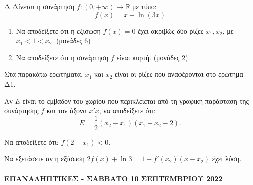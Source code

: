 \begin{thema}{Δ}
Δίνεται η συνάρτηση $f: (0, +\infty) \to \mathbb{R}$ με τύπο:
\[
f(x) = x - \ln(3x)
\]
\begin{erwthma}
    \item
    \begin{enumerate}[label=\roman*)]
        \item Να αποδείξετε ότι η εξίσωση $f(x) = 0$ έχει ακριβώς δύο ρίζες $x_1, x_2$, με $x_1 < 1 < x_2$. \hfill (μονάδες 6)
        \item Να αποδείξετε ότι η συνάρτηση $f$ είναι κυρτή. \hfill (μονάδες 2)
    \end{enumerate}
Στα παρακάτω ερωτήματα, $x_1$ και $x_2$ είναι οι ρίζες που αναφέρονται στο ερώτημα Δ1.

    \item Αν $E$ είναι το εμβαδόν του χωρίου που περικλείεται από τη γραφική παράσταση της συνάρτησης $f$ και τον άξονα $x'x$, να αποδείξετε ότι:
    \[
    E = \frac{1}{2}(x_2 - x_1)(x_1 + x_2 - 2).
    \]

    \item Να αποδείξετε ότι: $f(2 - x_1) < 0$. 

    \item Να εξετάσετε αν η εξίσωση $2f(x) + \ln 3 = 1 + f'(x_2)(x - x_2)$ έχει λύση. 
\end{erwthma}
\end{thema}

\paragraph{ΕΠΑΝΑΛΗΠΤΙΚΕΣ - ΣΑΒΒΑΤΟ 10 ΣΕΠΤΕΜΒΡΙΟΥ 2022}

